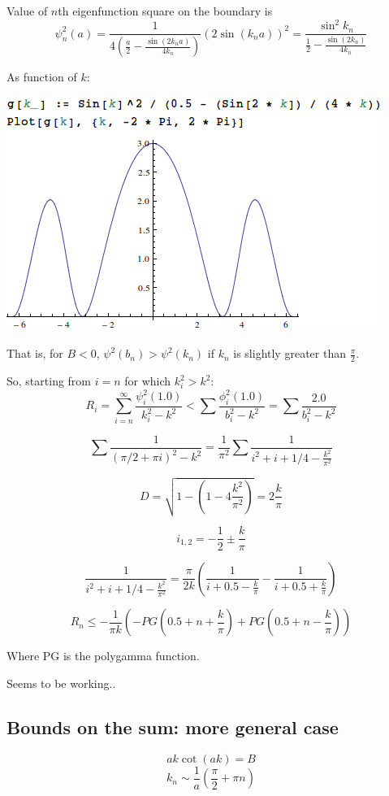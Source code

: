\documentclass[12pt, a4paper]{article}
\begin{document}
Value of $n$th eigenfunction square on the boundary is $$\psi^2_n(a) = \frac{1}{4 (\frac{a}{2} - \frac{\sin(2 k_n a)}{4k_n})} (2 \sin(k_na))^2 = \frac{\sin^2 k_n}{\frac{1}{2} - \frac{\sin (2 k_n)}{4 k_n}}$$

As function of $k$:

\includegraphics[scale=0.6]{fun.png}

That is, for $B < 0$, $\psi^2(b_n) > \psi^2(k_n)$ if $k_n$ is slightly greater than $\frac{\pi}{2}$.

So, starting from $i = n$ for which $k^2_i > k^2$:
$$R_i = \sum\limits_{i = n}^\infty \frac{\psi_i^2(1.0)}{k_i^2 - k^2} < \sum \frac{\phi^2_i(1.0)}{b_i^2 - k^2} = \sum \frac{2.0}{b_i^2 - k^2}$$

$$\sum \frac{1}{(\pi/2 + \pi i)^2 - k^2} = \frac{1}{\pi^2} \sum \frac{1}{i^2 + i + 1/4 - \frac{k^2}{\pi^2}}$$

$$D = \sqrt{1 - (1 - 4 \frac{k^2}{\pi^2})} = 2 \frac{k}{\pi}$$

$$i_{1, 2} = -\frac{1}{2} \pm \frac{k}{\pi}$$

$$\frac{1}{i^2 + i + 1/4 - \frac{k^2}{\pi^2}} = \frac{\pi}{2 k} \left( \frac{1}{i + 0.5 - \frac{k}{\pi}} - \frac{1}{i + 0.5 + \frac{k}{\pi}} \right)$$

$$R_n \le -\frac{1}{\pi k} (-PG(0.5 + n + \frac{k}{\pi}) + PG(0.5 + n - \frac{k}{\pi}))$$

Where PG is the polygamma function.

Seems to be working..



\subsection{Bounds on the sum: more general case}
$$a k \cot(ak) = B$$
$$k_n \sim \frac{1}{a}(\frac{\pi}{2} + \pi n)$$
\end{document}
